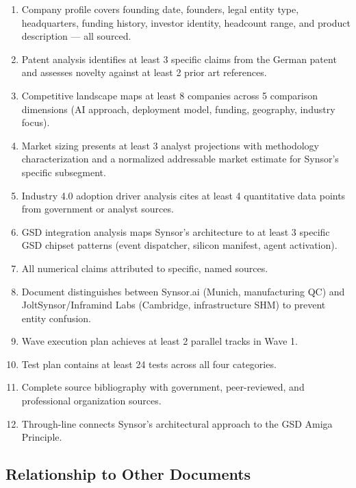\documentclass[11pt,letterpaper]{article}
\begin{document}
\begin{enumerate}[leftmargin=2em]
  \item Company profile covers founding date, founders, legal entity type, headquarters, funding history, investor identity, headcount range, and product description --- all sourced.
  \item Patent analysis identifies at least 3 specific claims from the German patent and assesses novelty against at least 2 prior art references.
  \item Competitive landscape maps at least 8 companies across 5 comparison dimensions (AI approach, deployment model, funding, geography, industry focus).
  \item Market sizing presents at least 3 analyst projections with methodology characterization and a normalized addressable market estimate for Synsor's specific subsegment.
  \item Industry 4.0 adoption driver analysis cites at least 4 quantitative data points from government or analyst sources.
  \item GSD integration analysis maps Synsor's architecture to at least 3 specific GSD chipset patterns (event dispatcher, silicon manifest, agent activation).
  \item All numerical claims attributed to specific, named sources.
  \item Document distinguishes between Synsor.ai (Munich, manufacturing QC) and JoltSynsor/Inframind Labs (Cambridge, infrastructure SHM) to prevent entity confusion.
  \item Wave execution plan achieves at least 2 parallel tracks in Wave 1.
  \item Test plan contains at least 24 tests across all four categories.
  \item Complete source bibliography with government, peer-reviewed, and professional organization sources.
  \item Through-line connects Synsor's architectural approach to the GSD Amiga Principle.
\end{enumerate}

\subsection{Relationship to Other Documents}
\end{document}
